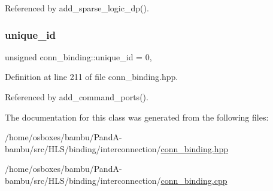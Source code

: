 Referenced by add\+\_\+sparse\+\_\+logic\+\_\+dp().

\mbox{\label{classconn__binding_a3c372bf7271e49d0d73a667dafac8449}} 
\subsubsection{\texorpdfstring{unique\+\_\+id}{unique\_id}}
{\footnotesize\ttfamily unsigned conn\+\_\+binding\+::unique\+\_\+id = 0\hspace{0.3cm}{\ttfamily [static]}, {\ttfamily [protected]}}



Definition at line 211 of file conn\+\_\+binding.\+hpp.



Referenced by add\+\_\+command\+\_\+ports().



The documentation for this class was generated from the following files\+:\begin{DoxyCompactItemize}
\item 
/home/osboxes/bambu/\+Pand\+A-\/bambu/src/\+H\+L\+S/binding/interconnection/\hyperlink{conn__binding_8hpp}{conn\+\_\+binding.\+hpp}\item 
/home/osboxes/bambu/\+Pand\+A-\/bambu/src/\+H\+L\+S/binding/interconnection/\hyperlink{conn__binding_8cpp}{conn\+\_\+binding.\+cpp}\end{DoxyCompactItemize}
